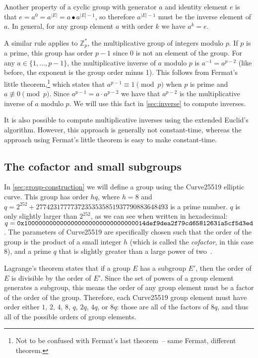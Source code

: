 \documentclass[manuscript]{acmart}
\begin{document}
Another property of a cyclic group with generator $a$ and identity element $e$ is that $e = a^0 = a^{|E|} = a \bullet a^{|E|-1}$, so therefore $a^{|E|-1}$ must be the inverse element of $a$.
In general, for any group element $a$ with order $k$ we have $a^k = e$.

A similar rule applies to $\mathbb{Z}_p^*$, the multiplicative group of integers modulo $p$.
If $p$ is a prime, this group has order $p-1$ since 0 is not an element of the group.
For any $a \in \{1, \dots, p-1\}$, the multiplicative inverse of $a$ modulo $p$ is $a^{-1} = a^{p-2}$ (like before, the exponent is the group order minus 1).
This follows from Fermat's little theorem,\footnote{Not to be confused with Fermat's last theorem~-- same Fermat, different theorem.} which states that $a^{p-1} \equiv 1 \pmod{p}$ when $p$ is prime and $a \not\equiv 0 \pmod{p}$.
Since $a^{p-1} = a \cdot a^{p-2}$ we have that $a^{p-2}$ is the multiplicative inverse of $a$ modulo $p$.
We will use this fact in \autoref{sec:inverse} to compute inverses.

It is also possible to compute multiplicative inverses using the extended Euclid's algorithm.
However, this approach is generally not constant-time, whereas the approach using Fermat's little theorem is easy to make constant-time.

\subsection{The cofactor and small subgroups}\label{sec:cofactor}

In \autoref{sec:group-construction} we will define a group using the Curve25519 elliptic curve.
This group has order $hq$, where $h=8$ and $q = 2^{252} + 27742317777372353535851937790883648493$ is a prime number.
$q$ is only slightly larger than $2^{252}$, as we can see when written in hexadecimal: $q = \verb|0x1000000000000000000000000000000014def9dea2f79cd65812631a5cf5d3ed|$.
The parameters of Curve25519 are specifically chosen such that the order of the group is the product of a small integer $h$ (which is called the \emph{cofactor}, in this case 8), and a prime $q$ that is slightly greater than a large power of two~\cite{Bernstein:2006kw}.

Lagrange's theorem states that if a group $E$ has a subgroup $E'$, then the order of $E$ is divisible by the order of $E'$.
Since the set of powers of a group element generates a subgroup, this means the order of any group element must be a factor of the order of the group.
Therefore, each Curve25519 group element must have order either $1$, $2$, $4$, $8$, $q$, $2q$, $4q$, or $8q$: those are all of the factors of $8q$, and thus all of the possible orders of group elements.
\end{document}
